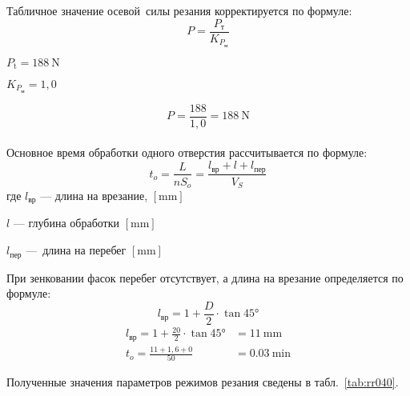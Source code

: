 \documentclass[14pt,russian,a4paper]{extreport}
\begin{document}
Табличное значение осевой силы резания корректируется по формуле:
$$ P = \frac{P_\text{т}}{K_{P_\text{м}}} $$

$ P_\text{t} = \SI{188}{\newton} $ \cite[карта 46]{guzeev:rr} \par
$ K_{P_\text{м}} = 1,0 $ \cite[карта 53]{guzeev:rr}

$$ P = \frac{188}{1,0} = \SI{188}{\newton} $$ \\

Основное время обработки одного отверстия рассчитывается по формуле:
\begin{equation*}
  t_o = \frac{L}{n S_o} = \frac{l_\text{вр} + l + l_\text{пер}}{V_S}
\end{equation*}
где $l_\text{вр}$ --- длина на врезание, $\left[\si{\milli\meter}\right]$ \par
$l$ --- глубина обработки $\left[\si{\milli\meter}\right]$ \par
$l_\text{пер}$ --- длина на перебег $\left[\si{\milli\meter}\right]$

При зенковании фасок перебег отсутствует, а длина на врезание определяется по формуле:
\begin{equation*}
  l_\text{вр} = 1 + \frac{D}{2} \cdot \tan{\ang{45}}
\end{equation*}
\begin{align*}
    l_\text{вр} = 1 + \frac{20}{2} \cdot \tan{\ang{45}} &= \SI{11}{\milli\meter} \\
    t_o = \frac{11 + 1,6 + 0}{50} &= \SI{0,03}{\minute}
\end{align*}

Полученные значения параметров режимов резания сведены в табл.~\ref{tab:rr040}.
\end{document}
